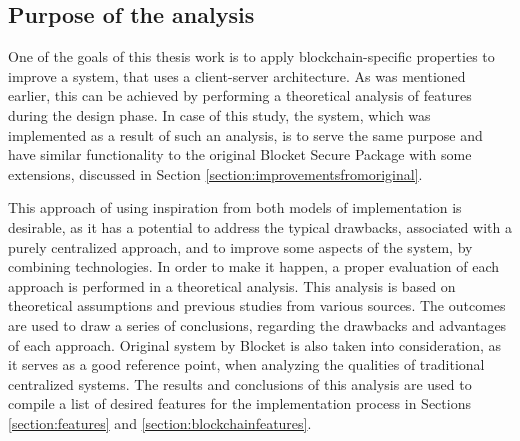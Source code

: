 \subsection{Purpose of the analysis}
One of the goals of this thesis work is to apply blockchain-specific properties to improve a system, that uses a client-server architecture. As was mentioned earlier, this can be achieved by performing a theoretical analysis of features during the design phase. In case of this study, the system, which was implemented as a result of such an analysis, is to serve the same purpose and have similar functionality to the original Blocket Secure Package with some extensions, discussed in Section \ref{section:improvementsfromoriginal}. 

This approach of using inspiration from both models of implementation is desirable, as it has a potential to address the typical drawbacks, associated with a purely centralized approach, and to improve some aspects of the system, by combining technologies. In order to make it happen, a proper evaluation of each approach is performed in a theoretical analysis. This analysis is based on theoretical assumptions and previous studies from various sources. The outcomes are used to draw a series of conclusions, regarding the drawbacks and advantages of each approach. Original system by Blocket is also taken into consideration, as it serves as a good reference point, when analyzing the qualities of traditional centralized systems. The results and conclusions of this analysis are used to compile a list of desired features for the implementation process in Sections \ref{section:features} and \ref{section:blockchainfeatures}.



